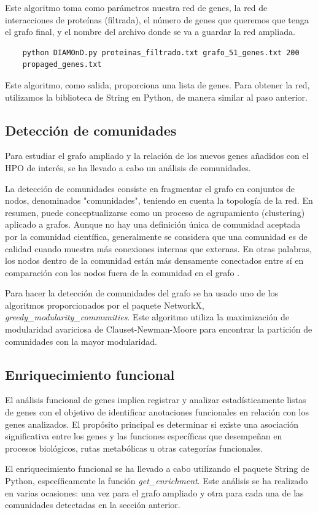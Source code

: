Este algoritmo toma como parámetros nuestra red de genes, la red de interacciones de proteínas (filtrada), el número de genes que queremos que tenga el grafo final, y el nombre del archivo donde se va a guardar la red ampliada.

\begin{verbatim}
	python DIAMOnD.py proteinas_filtrado.txt grafo_51_genes.txt 200
	propaged_genes.txt
\end{verbatim}

Este algoritmo, como salida, proporciona una lista de genes. Para obtener la red, utilizamos la biblioteca de String en Python, de manera similar al paso anterior.

\subsection{Detección de comunidades}

Para estudiar el grafo ampliado y la relación de los nuevos genes añadidos con el HPO de interés, se ha llevado a cabo un análisis de comunidades.

La detección de comunidades consiste en fragmentar el grafo en conjuntos de nodos, denominados "comunidades", teniendo en cuenta la topología de la red. En resumen, puede conceptualizarse como un proceso de agrupamiento (clustering) aplicado a grafos. Aunque no hay una definición única de comunidad aceptada por la comunidad científica, generalmente se considera que una comunidad es de calidad cuando muestra más conexiones internas que externas. En otras palabras, los nodos dentro de la comunidad están más densamente conectados entre sí en comparación con los nodos fuera de la comunidad en el grafo \cite{PanizoLledot}.

Para hacer la detección de comunidades del grafo se ha usado uno de los algoritmos proporcionados por el paquete NetworkX,\textit{ greedy\_modularity\_communities}. Este algoritmo utiliza la maximización de modularidad avariciosa de Clauset-Newman-Moore \cite{Clauset2004} para encontrar la partición de comunidades con la mayor modularidad.


\subsection{Enriquecimiento funcional}

El análisis funcional de genes implica registrar y analizar estadísticamente listas de genes con el objetivo de identificar anotaciones funcionales en relación con los genes analizados. El propósito principal es determinar si existe una asociación significativa entre los genes y las funciones específicas que desempeñan en procesos biológicos, rutas metabólicas u otras categorías funcionales. 

El enriquecimiento funcional se ha llevado a cabo utilizando el paquete String de Python, específicamente la función \textit{get\_enrichment}. Este análisis se ha realizado en varias ocasiones: una vez para el grafo ampliado y otra para cada una de las comunidades detectadas en la sección anterior.
